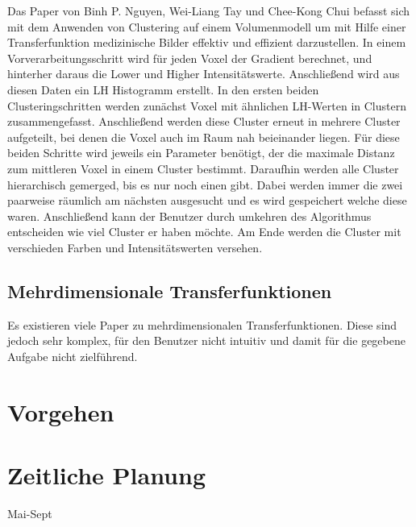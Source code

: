 \documentclass{article}
\begin{document}
Das Paper von Binh P. Nguyen, Wei-Liang Tay und Chee-Kong Chui \cite{nguyen2012clustering} befasst sich mit dem Anwenden von Clustering auf einem Volumenmodell um mit Hilfe einer Transferfunktion medizinische Bilder effektiv und effizient darzustellen.
\newline
In einem Vorverarbeitungsschritt wird für jeden Voxel der Gradient berechnet, und hinterher daraus die Lower und Higher Intensitätswerte. Anschließend wird aus diesen Daten ein LH Histogramm erstellt.
\newline
In den ersten beiden Clusteringschritten werden zunächst Voxel mit ähnlichen  LH-Werten in Clustern zusammengefasst. Anschließend werden diese Cluster erneut in mehrere Cluster aufgeteilt, bei denen die Voxel auch im Raum nah beieinander liegen. Für diese beiden Schritte wird jeweils ein Parameter benötigt, der die maximale Distanz zum mittleren Voxel in einem Cluster bestimmt. Daraufhin werden alle Cluster hierarchisch gemerged, bis es nur noch einen gibt. Dabei werden immer die zwei paarweise räumlich am nächsten ausgesucht und es wird gespeichert welche diese waren. Anschließend kann der Benutzer durch umkehren des Algorithmus entscheiden wie viel Cluster er haben möchte. Am Ende werden die Cluster mit verschieden Farben und Intensitätswerten versehen.



\subsection{Mehrdimensionale Transferfunktionen}

Es existieren viele Paper zu mehrdimensionalen Transferfunktionen. Diese sind jedoch sehr komplex, für den Benutzer nicht intuitiv und damit für die gegebene Aufgabe nicht zielführend.


\section{Vorgehen}

\section{Zeitliche Planung}
Mai-Sept

{}

\nocite{*}
\end{document}

